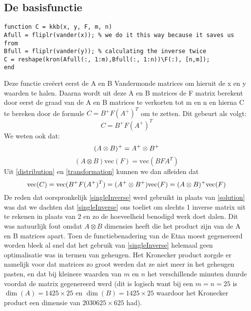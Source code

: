 \documentclass[a4paper]{article}
\begin{document}
\subsection{De basisfunctie}
\begin{verbatim}
function C = kkb(x, y, F, m, n)
Afull = fliplr(vander(x)); % we do it this way because it saves us from
Bfull = fliplr(vander(y)); % calculating the inverse twice
C = reshape(kron(Afull(:, 1:m),Bfull(:, 1:n))\F(:), [n,m]);
end
\end{verbatim}
Deze functie creëert eerst de A en B Vandermonde matrices om hieruit de x en y waarden te halen. Daarna wordt uit deze A en B matrices de F matrix berekent door eerst de graad van de A en B matrices te verkorten tot m en n en hierna C te bereken door de formule $C = B^{+}F(A^{+})^{T}$ om te zetten. Dit gebeurt als volgt:
\begin{equation}
C = B^{+}F(A^{+})^{T} \label{solution}
\end{equation}
We weten ook dat:
\begin{equation}
(A\otimes B)^{+} = A^{+} \otimes B^{+} \label{distribution}\\
\end{equation}
\begin{equation}
(A\otimes B)\text{vec}(F) = \text{vec}(BFA^{T}) \label{transformation}
\end{equation}
Uit \eqref{distribution} en \eqref{transformation} kunnen we dan afleiden dat
\begin{equation}
\text{vec}(C) = \text{vec}(B^{+}F(A^{+})^{T}) = (A^{+}\otimes B^{+})\text{vec}(F) = (A\otimes B)^{+}\text{vec}(F) \label{singleInverse}\\
\end{equation}
De reden dat oorspronkelijk \eqref{singleInverse} werd gebruikt in plaats van \eqref{solution} was dat we dachten dat \eqref{singleInverse} ons toeliet om slechts 1 inverse matrix uit te rekenen in plaats van 2 en zo de hoeveelheid benodigd werk doet dalen. Dit was natuurlijk fout omdat $A\otimes B$ dimensies heeft die het product zijn van de A en B matrices apart. Toen de functiebenadering van de Etna moest gegenereerd worden bleek al snel dat het gebruik van \eqref{singleInverse} helemaal geen optimalisatie was in termen van geheugen. Het Kronecker product zorgde er namelijk voor dat matrices zo groot werden dat ze niet meer in het geheugen pasten, en dat bij kleinere waarden van $m$ en $n$ het verschillende minuten duurde voordat de matrix gegenereerd werd (dit is logisch want bij een $m = n = 25$ is $\dim(A) = 1425\times25$ en $\dim(B) = 1425\times25$ waardoor het Kronecker product een dimensie van $2030625\times625$ had).
\end{document}
